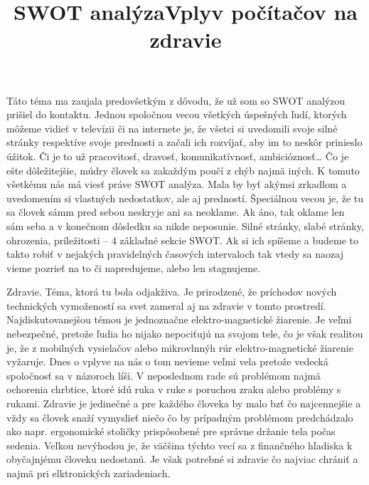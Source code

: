 \documentclass[10pt,oneside,slovak,a4paper]{article}
\begin{document}
\title{SWOT analýza}
\maketitle\newline

Táto téma ma zaujala predovšetkým z dôvodu, že už som so SWOT analýzou prišiel do kontaktu. Jednou spoločnou vecou všetkých úspešných ľudí, ktorých môžeme vidieť v televízii či na internete je, že všetci si uvedomili svoje silné stránky respektíve svoje prednosti a začali ich rozvíjať, aby im to neskôr prinieslo úžitok. Či je to už pracovitosť, dravosť, komunikatívnosť, ambicióznosť… Čo je ešte dôležitejšie, múdry človek sa zakaždým poučí z chýb najmä iných. K tomuto všetkému nás má viesť práve SWOT analýza. Mala by byť akýmsi zrkadlom a uvedomením si vlastných nedostatkov, ale aj predností. Špeciálnou vecou je, že tu sa človek sámm pred sebou neskryje ani sa neoklame. Ak áno, tak oklame len sám seba a v konečnom dôsledku sa nikde neposunie. Silné stránky, slabé stránky, ohrozenia, príležitosti – 4 základné sekcie SWOT. Ak si ich spíšeme a budeme to takto robiť v nejakých pravidelných časových intervaloch tak vtedy sa naozaj vieme pozrieť na to či napredujeme, alebo len stagnujeme.\newline


\title{Vplyv počítačov na zdravie}
\maketitle\newline

Zdravie. Téma, ktorá tu bola odjakživa. Je prirodzené, že príchodov nových technických vymožeností sa svet zameral aj na zdravie v tomto prostredí. Najdiskutovanejšou témou je jednoznačne elektro-magnetické žiarenie. Je veľmi nebezpečné, pretože ľudia ho nijako nepociťujú na svojom tele, čo je však realitou je, že z mobilných vysielačov alebo mikrovlnnýh rúr elektro-magnetické žiarenie vyžaruje. Dnes o vplyve na nás o tom nevieme veľmi vela pretože vedecká spoločnosť sa v názoroch líši. V neposlednom rade sú problémom najmä ochorenia chrbtice, ktoré idú ruka v ruke s poruchou zraku alebo problémy s rukami. Zdravie je jedinečné a pre každého človeka by malo bzť čo najcennejšie a vždy sa človek snaží vymyslieť niečo čo by prípadným problémom predchádzalo ako napr. ergonomické stoličky prispôsobené pre správne držanie tela počas sedenia. Veľkou nevýhodou je, že väčšina týchto vecí sa z finančného hľadiska k obyčajnjému človeku nedostanú. Je však potrebné si zdravie čo najviac chrániť a najmä pri elktronických zariadeniach.\newline
\end{document}

